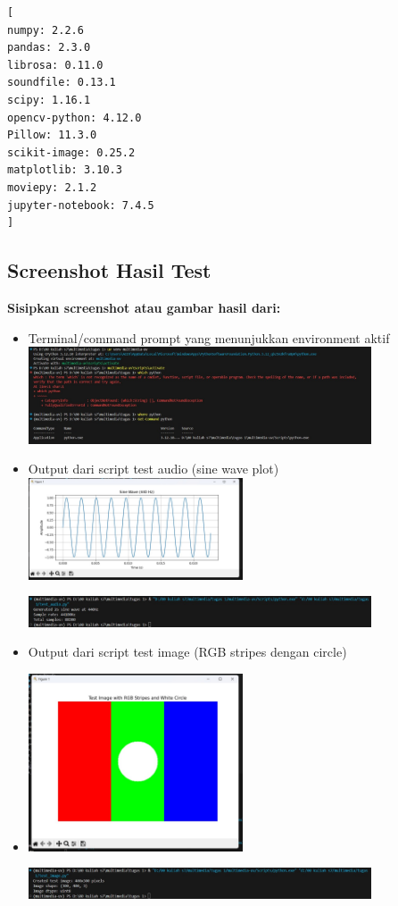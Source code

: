 \documentclass[11pt,a4paper]{article}
\begin{document}
\begin{lstlisting}[caption=Output verifikasi instalasi]
[
numpy: 2.2.6
pandas: 2.3.0
librosa: 0.11.0
soundfile: 0.13.1
scipy: 1.16.1
opencv-python: 4.12.0
Pillow: 11.3.0
scikit-image: 0.25.2
matplotlib: 3.10.3
moviepy: 2.1.2
jupyter-notebook: 7.4.5
]
\end{lstlisting}

\subsection{Screenshot Hasil Test}
\textbf{Sisipkan screenshot atau gambar hasil dari:}
\begin{itemize}
    \item Terminal/command prompt yang menunjukkan environment aktif \\
    \includegraphics[width=0.8\textwidth]{figure/ss1.jpg}
    \item Output dari script test audio (sine wave plot) \\
    \includegraphics[width=0.5\textwidth]{figure/ss8.jpg}

    \includegraphics[width=0.8\textwidth]{figure/ss8verif.jpg}
    \item Output dari script test image (RGB stripes dengan circle) \\
    \item \includegraphics[width=0.5\textwidth]{figure/ss9.jpg}

    \includegraphics[width=0.8\textwidth]{figure/ss9verif.jpg}
\end{itemize}
\end{document}
